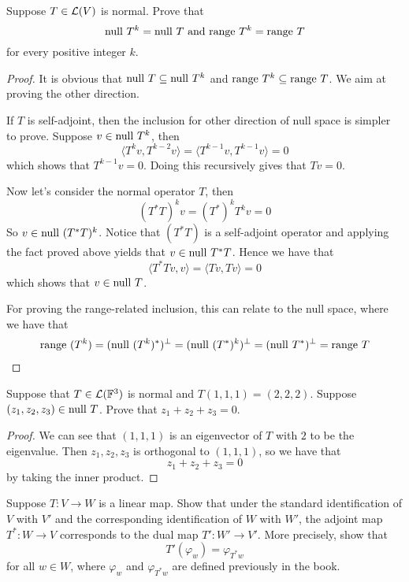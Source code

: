 \documentclass{extarticle}
\begin{document}
\begin{problem}{27}
    Suppose \(T \in \mathcal{L}(V)\) is normal. Prove that 
    \[\text{null } T^k = \text{null } T \text{ and } \text{range } T^k = \text{range } T\]
    for every positive integer \(k\).
\end{problem}

\begin{proof}
It is obvious that \(\text{null } T \subseteq \text{null } T^k\) and \(\text{range } T^k \subseteq 
\text{range } T\). We aim at proving the other direction. 

If \(T\) is self-adjoint, then the inclusion for other direction of null space is simpler to prove. 
Suppose \(v \in \text{null } T^k\), then 
\[\langle T^k v, T^{k-2} v \rangle = \langle T^{k-1} v, T^{k-1}v \rangle = 0\]
which shows that \(T^{k-1} v= 0\). Doing this recursively gives that \(T v = 0\). 

Now let's consider the normal operator \(T\), then 
\[(T^* T)^k v = (T^*)^k T^k v = 0\]
So \(v \in \text{null } (T^* T)^k\). Notice that \((T^* T)\) is a self-adjoint operator and applying the fact 
proved above yields that \(v \in \text{null } T^* T \). Hence we have that 
\[\langle T^* Tv,v \rangle = \langle Tv, Tv \rangle = 0\]
which shows that \(v \in \text{null } T\). 

For proving the range-related inclusion, this can relate to the null space, where we have that 
\begin{align*}
    \text{range } (T^k) = (\text{null } (T^k)^*)^\perp = (\text{null } (T^*)^k)^\perp = (\text{null } T^*)^\perp = \text{range } T  
\end{align*}
\end{proof}

\begin{problem}{30}
    Suppose that \(T \in \mathcal{L}(\mathbb{F}^3)\) is normal and \(T(1, 1 ,1) = (2, 2, 2)\). Suppose 
    \((z_1, z_2, z_3) \in \text{null } T\). Prove that \(z_1 + z_2 + z_3 = 0\).
\end{problem}

\begin{proof}
We can see that \((1,1,1)\) is an eigenvector of \(T\) with \(2\) to be the eigenvalue. Then 
\(z_1, z_2, z_3\) is orthogonal to \((1,1,1)\), so we have that 
\[z_1 + z_2 + z_3 = 0\]
by taking the inner product. 
\end{proof}

\begin{problem}{32}
    Suppose \(T \colon V \to W\) is a linear map. Show that under the standard identification of 
    \(V\) with \(V'\) and the corresponding identification of \(W\) with \(W'\), the adjoint map 
    \(T^* \colon W \to V\) corresponds to the dual map \(T' \colon W' \to V'\). More precisely, show 
    that 
    \[T'(\varphi_w) = \varphi_{T^* w}\] 
    for all \(w \in W\), where \(\varphi_w\) and \(\varphi_{T^* w}\) are defined previously in the 
    book. 
\end{problem}
\end{document}
